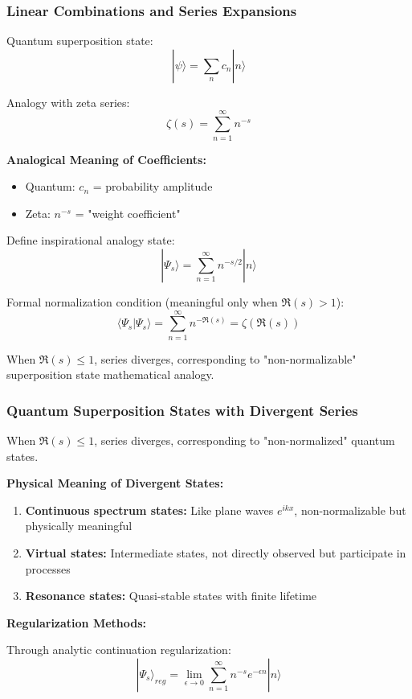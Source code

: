 \documentclass[11pt]{article}
\theoremstyle{plain}
\theoremstyle{definition}
\theoremstyle{remark}
\begin{document}
\subsubsection{Linear Combinations and Series Expansions}

Quantum superposition state:
$$|\psi\rangle = \sum_{n} c_n |n\rangle$$

Analogy with zeta series:
$$\zeta(s) = \sum_{n=1}^{\infty} n^{-s}$$

\textbf{Analogical Meaning of Coefficients:}
\begin{itemize}
\item Quantum: $c_n$ = probability amplitude
\item Zeta: $n^{-s}$ = "weight coefficient"
\end{itemize}

Define inspirational analogy state:
$$|\Psi_s\rangle = \sum_{n=1}^{\infty} n^{-s/2} |n\rangle$$

Formal normalization condition (meaningful only when $\Re(s) > 1$):
$$\langle \Psi_s | \Psi_s \rangle = \sum_{n=1}^{\infty} n^{-\Re(s)} = \zeta(\Re(s))$$

When $\Re(s) \leq 1$, series diverges, corresponding to "non-normalizable" superposition state mathematical analogy.

\subsubsection{Quantum Superposition States with Divergent Series}

When $\Re(s) \leq 1$, series diverges, corresponding to "non-normalized" quantum states.

\textbf{Physical Meaning of Divergent States:}

\begin{enumerate}
\item \textbf{Continuous spectrum states:} Like plane waves $e^{ikx}$, non-normalizable but physically meaningful
\item \textbf{Virtual states:} Intermediate states, not directly observed but participate in processes
\item \textbf{Resonance states:} Quasi-stable states with finite lifetime
\end{enumerate}

\textbf{Regularization Methods:}

Through analytic continuation regularization:
$$|\Psi_s\rangle_{reg} = \lim_{\epsilon \to 0} \sum_{n=1}^{\infty} n^{-s} e^{-\epsilon n} |n\rangle$$
\end{document}
